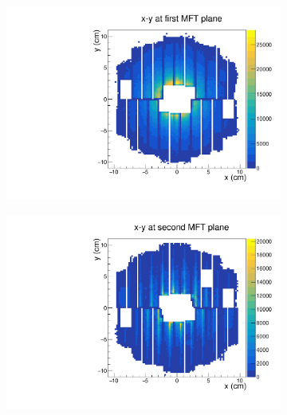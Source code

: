 \begin{figure}[H]%
    \centering
    \begin{subfigure}[t]{.45\linewidth}
        \centering
        \includegraphics[width=\linewidth]{Plots/pass3_MFT/x_y_1_pass3.pdf}
        \caption{}
        \label{fig:x_y_1_pass3}
    \end{subfigure}
    \hfill
    \begin{subfigure}[t]{.45\linewidth}
        \centering
        \includegraphics[width=\linewidth]{Plots/pass3_MFT/x_y_2_pass3.pdf}
        \caption{}
        \label{fig:x_y_2_pass3}
    \end{subfigure}
    \begin{subfigure}[t]{.45\linewidth}
        \centering

\end{subfigure}
\end{figure}
